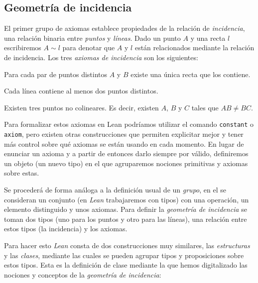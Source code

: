 \subsection{Geometría de incidencia}

El primer grupo de axiomas establece propiedades de la relación de
\textit{incidencia}, una relación binaria entre \textit{puntos} y
\textit{líneas}. Dado un punto $A$ y una recta $l$ escribiremos $A\sim l$ para
denotar que $A$ y $l$ están relacionados mediante la relación de incidencia.
Los tres \textit{axiomas de incidencia} son los siguientes:

\begin{ax}\label{ax:I1}
	Para cada par de puntos distintos $A$ y $B$ existe una única recta que los
	contiene.
\end{ax}

\begin{ax}\label{ax:I2}
	Cada línea contiene al menos dos puntos distintos.
\end{ax}

\begin{ax}\label{ax:I3}
	Existen tres puntos no colineares. Es decir, existen $A$, $B$ y $C$ tales que
	$AB\neq BC$.
\end{ax}

Para formalizar estos axiomas en Lean podríamos utilizar el comando
\lstinline{constant} o \lstinline{axiom}, pero existen otras construcciones que
permiten explicitar mejor y tener más control sobre qué axiomas se están
usando en cada momento. En lugar de enunciar un axioma y a partir de entonces
darlo siempre por válido, definiremos un objeto (un nuevo tipo) en el que
agruparemos nociones primitivas y axiomas sobre estas.

Se procederá de forma análoga a la definición usual de un \textit{grupo}, en el
se consideran un conjunto (en \textit{Lean} trabajaremos con tipos) con una
operación, un elemento distinguido y unos axiomas. Para definir la
\textit{geometría de incidencia} se toman dos tipos (uno para los puntos y otro
para las líneas), una relación entre estos tipos (la incidencia) y los axiomas.

Para hacer esto \textit{Lean} consta de dos construcciones muy similares, las
\textit{estructuras} y las \textit{clases}, mediante las cuales se pueden
agrupar tipos y proposiciones sobre estos tipos.
Esta es la definición de clase mediante la que
hemos digitalizado las nociones y conceptos de la \textit{geometría de incidencia}:

